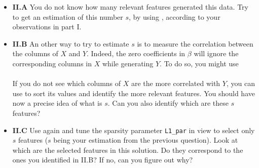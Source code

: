 \documentclass[DIN, pagenumber=false, fontsize=11pt, parskip=half]{scrartcl}
\begin{document}
\begin{itemize}
  \item \textbf{II.A} You do not know how many relevant features generated this data.
  Try to get an estimation of this number $s$, by using , according to your observations in part I.
  
  \item \textbf{II.B} An other way to try to estimate $s$ is to measure the correlation between the columns of $X$ and $Y$.
  Indeed, the zero coefficients in $\beta$ will ignore the corresponding columns in $X$ while generating $Y$. 
  To do so, you might use\\
  \\
  If you do not see which columns of $X$ are the more correlated with $Y$, you can use  to sort its values and identify the more relevant features.
You should have now a precise idea of what is $s$.
Can you also identify which are these $s$ features?  
  
  \item \textbf{II.C} Use again  and tune the sparsity parameter \texttt{L1\_par} in view to select only $s$ features ($s$ being your estimation from the previous question). 
  Look at which are the selected features in this solution.
  Do they correspond to the ones you identified in II.B?
  If no, can you figure out why?\\
\end{itemize}
\end{document}

